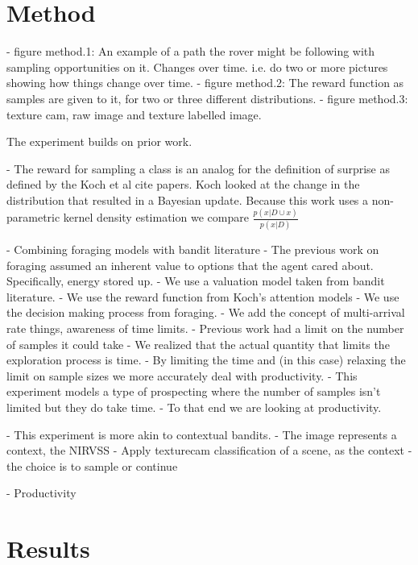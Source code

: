 \documentclass[preprint,12pt,3p]{elsarticle}
\begin{document}


\section{Method}
\label{sec:method}

	- figure method.1: An example of a path the rover might be following with sampling opportunities on it.  Changes over time. i.e. do two or more pictures showing how things change over time.
	- figure method.2: The reward function as samples are given to it, for two or three different distributions.
	- figure method.3: texture cam, raw image and texture labelled image.

	The experiment builds on prior work.  

	- The reward for sampling a class is an analog for the definition of surprise as defined by the Koch et al {cite papers}.  Koch looked at the change in the distribution that resulted in a Bayesian update.  Because this work uses a non-parametric kernel density estimation we compare $\frac{p(x|D\cup{x})}{p(x|D)}$

	- Combining foraging models with bandit literature 
		- The previous work on foraging assumed an inherent value to
			options that the agent cared about.  Specifically, energy stored up.
		- We use a valuation model taken from bandit literature.  
		- We use the reward function from Koch's attention models
		- We use the decision making process from foraging. 
		- We add the concept of multi-arrival rate things, awareness of time limits.
	- Previous work had a limit on the number of samples it could take
		- We realized that the actual quantity that limits the exploration process
			is time.
		- By limiting the time and (in this case) relaxing the limit on sample sizes
			we more accurately deal with productivity.  
	- This experiment models a type of prospecting where the number of samples isn't limited but they do take time. 
	- To that end we are looking at productivity.

	-  This experiment is more akin to contextual bandits.  
	- The image represents a context, the NIRVSS 
	- Apply texturecam classification of a scene, as the context
	- the choice is to sample or continue

	- Productivity 


\section{Results}
\label{sec:results}
\end{document}
